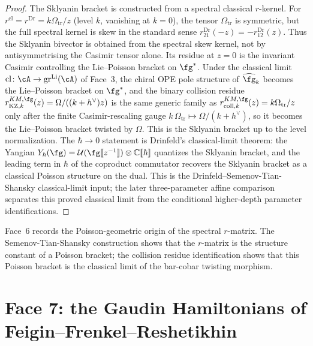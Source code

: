 \begin{proof}
The Sklyanin bracket is constructed from a spectral classical
$r$-kernel. For
$r^{\mathrm{cl}} = r^{\mathrm{Dr}} = k\Omega_{\mathrm{tr}}/z$
\textup{(}level $k$, vanishing at $k=0$\textup{)}, the tensor
$\Omega_{\mathrm{tr}}$ is symmetric, but the full spectral kernel is
skew in the standard sense
$r^{\mathrm{Dr}}_{21}(-z)=-r^{\mathrm{Dr}}_{12}(z)$. Thus the
Sklyanin bivector is obtained from the spectral skew kernel, not by
antisymmetrising the Casimir tensor alone. Its residue at $z=0$ is
the invariant Casimir controlling the Lie--Poisson bracket on
$\fg^*$. Under the classical limit
$\mathrm{cl}\colon \cA \to \mathrm{gr}^{\mathrm{Li}}(\cA)$ of
Face~3, the chiral OPE pole structure of $\widehat{\fg}_k$ becomes
the Lie--Poisson bracket on $\fg^*$, and the binary collision
residue $r^{KM,\fg}_{\mathrm{KZ},k}(z) = \Omega/((k+h^\vee)z)$
is the same generic family as
$r^{KM,\fg}_{\mathrm{coll},k}(z)=k\Omega_{\mathrm{tr}}/z$ only after
the finite Casimir-rescaling gauge
$k\,\Omega_{\mathrm{tr}}\mapsto\Omega/(k+h^\vee)$, so it becomes the
Lie--Poisson bracket twisted by $\Omega$. This is the Sklyanin
bracket up to the level normalization. The $\hbar \to 0$ statement
is Drinfeld's classical-limit theorem: the Yangian
$Y_\hbar(\fg) = \mathcal{U}(\fg[\![z^{-1}]\!])\otimes\mathbb{C}[\![\hbar]\!]$
quantizes the Sklyanin bracket, and the leading term in $\hbar$ of
the coproduct commutator recovers the Sklyanin bracket as a
classical Poisson structure on the dual. This is the
Drinfeld--Semenov-Tian-Shansky classical-limit input; the later
three-parameter affine comparison separates this proved classical
limit from the conditional higher-depth parameter identifications.
\end{proof}

Face~6 records the Poisson-geometric origin of the spectral
$r$-matrix. The Semenov-Tian-Shansky construction shows that the
$r$-matrix is the structure constant of a Poisson bracket; the
collision residue identification shows that this Poisson bracket is
the classical limit of the bar-cobar twisting morphism.

\section{Face 7: the Gaudin Hamiltonians of Feigin--Frenkel--Reshetikhin}
\label{sec:hdm-face-7}

